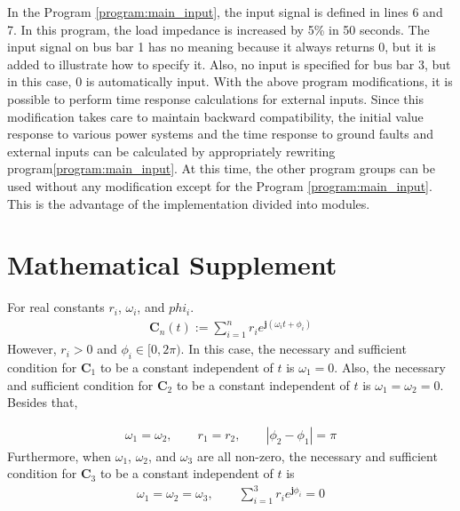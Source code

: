 \documentclass[tombow,dvipdfmx]{corona-a5-1.1}
\begin{document}
\begin{例}
In the Program \nobreak\ref{program:main_input}, the input signal is defined in lines 6 and 7. In this program, the load impedance is increased by 5\% in 50 seconds.
The input signal on bus bar 1 has no meaning because it always returns 0, but it is added to illustrate how to specify it.
Also, no input is specified for bus bar 3, but in this case, 0 is automatically input.
With the above program modifications, it is possible to perform time response calculations for external inputs.
Since this modification takes care to maintain backward compatibility, the initial value response to various power systems and the time response to ground faults and external inputs can be calculated by appropriately rewriting program\nobreak\ref{program:main_input}.
At this time, the other program groups can be used without any modification except for the Program \nobreak\ref{program:main_input}.
This is the advantage of the implementation divided into modules.
\end{例}


\section*{Mathematical Supplement}
\begin{補題}\label{lem:sumc}
For real constants $r_i$, $\omega_i$, and $phi_i$.
\begin{align*}
\bm{C}_n(t) := 
\sum_{i=1}^n r_i e^{ \bm{j} (\omega_i t + \phi_i)}
\end{align*}
However, $r_i>0$ and $\phi_i \in [0,2\pi)$.
In this case, the necessary and sufficient condition for $\bm{C}_1$ to be a constant independent of $t$ is $\omega_1=0$.
Also, the necessary and sufficient condition for $\bm{C}_2$ to be a constant independent of $t$ is $\omega_1=\omega_2=0$.
Besides that,

\begin{align*}
\omega_1=\omega_2
,\qquad
r_1=r_2
,\qquad
|\phi_2-\phi_1| = \pi
\end{align*}
Furthermore, when $\omega_1$, $\omega_2$, and $\omega_3$ are all non-zero, the necessary and sufficient condition for $\bm{C}_3$ to be a constant independent of $t$ is
\begin{align*}
\omega_1=\omega_2=\omega_3
,\qquad
\sum_{i=1}^3 r_i e^{\bm{j}\phi_i}=0
\end{align*}
\end{補題}
\end{document}

